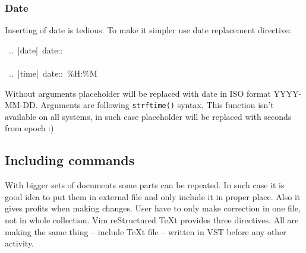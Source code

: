 \documentclass[12pt]{article}
\begin{document}
\subsubsection{Date}

Inserting of date is tedious. To make it simpler use date replacement
directive:

\begin{ttfamily}\begin{flushleft}
\mbox{~..~|date|~date::}\\
\mbox{}\\
\mbox{~..~|time|~date::~\%H:\%M}\\
\end{flushleft}\end{ttfamily}

Without arguments placeholder will be replaced with date in ISO format
YYYY-MM-DD. Arguments are following \texttt{strftime()} syntax. This function isn't
available on all systems, in such case placeholder will be replaced with
seconds from epoch :)

\hypertarget{lincluding-commands}{}
\subsection{Including commands}

With bigger sets of documents some parts can be repeated. In such case it is
good idea to put them in external file and only include it in proper place.
Also it gives profits when making changes. User have to only make correction
in one file, not in whole collection. Vim reStructured \TeX{}t provides three directives. All are
making the same thing -- include \TeX{}t file -- written in VST before any other
activity.
\end{document}
